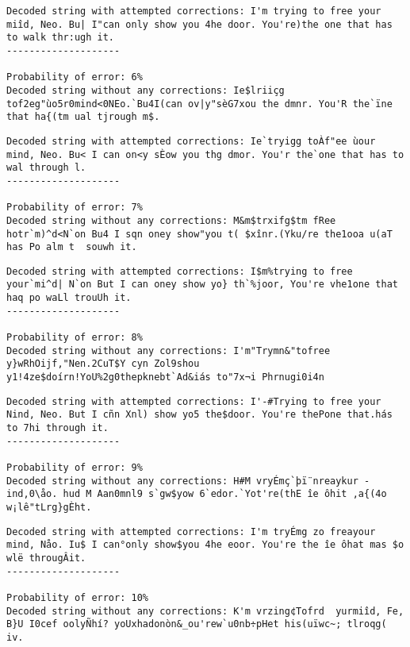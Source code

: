 \documentclass[
  letterpaper,
  DIV=11,
  numbers=noendperiod]{scrartcl}
\begin{document}
\begin{lstlisting}
Decoded string with attempted corrections: I'm trying to free your miîd, Neo. Bu| I"can only show you 4he door. You're)the one that has to walk thr:ugh it.
--------------------

Probability of error: 6%
Decoded string without any corrections: Ie$lriiçg tof2eg"ùo5r0mind<0NEo.`Bu4I(can ov|y"sèG7xou the dmnr. You'R the`ïne that ha{(tm ual tjrough m$.
\end{lstlisting}

\begin{lstlisting}
Decoded string with attempted corrections: Ie`tryigg toÀf"ee ùour mind, Neo. Bu< I can on<y sÈow you thg dmor. You'r the`one that has to wal through l.
--------------------

Probability of error: 7%
Decoded string without any corrections: M&m$trxifg$tm fRee hotr`m)^d<N`on Bu4 I sqn oney show"you t( $xînr.(Yku/re the1ooa u(aT has Po alm t  souwh it.
\end{lstlisting}

\begin{lstlisting}
Decoded string with attempted corrections: I$m%trying to free your`mi^d| N`on But I can oney show yo} th`%joor, You're vhe1one that haq po waLl trouUh it.
--------------------

Probability of error: 8%
Decoded string without any corrections: I'm"Trymn&"tofree y}wRhOijf,"Nen.2CuT$Y cyn Zol9shou y1!4ze$doírn!YoU%2g0thepknebt`Ad&iás to"7x¬i Phrnugi0i4n
\end{lstlisting}

\begin{lstlisting}
Decoded string with attempted corrections: I'-#Trying to free your Nind, Neo. But I cñn Xnl) show yo5 the$door. You're thePone that.hás to 7hi through it.
--------------------

Probability of error: 9%
Decoded string without any corrections: H#M vryÉmç`þï¨nreaykur -ind,0\åo. hud M Aan0mnl9 s`gw$yow 6`edor.`Yot're(thE îe ôhit ,a{(4o w¡lê"tLrg}gÈht.
\end{lstlisting}

\begin{lstlisting}
Decoded string with attempted corrections: I'm tryÉmg zo freayour mind, Nåo. Iu$ I can°only show$you 4he eoor. You're the îe ôhat mas $o wlë througÂit.
--------------------

Probability of error: 10%
Decoded string without any corrections: K'm vrzing¢Tofrd  yurmiîd, Fe, B}U I0cef oolyÑhí? yoUxhadonòn&_ou'rew`u0nb÷pHet his(uïwc~; tlroqg( iv.
\end{lstlisting}
\end{document}
